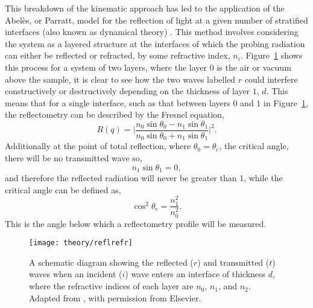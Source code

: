 This breakdown of the kinematic approach has led to the application of the Abel\`{e}s, or Parratt, model for the reflection of light at a given number of stratified interfaces (also known as dynamical theory) \cite{abeles_sur_1948,parratt_surface_1954}.
This method involves considering the system as a layered structure at the interfaces of which the probing radiation can either be reflected or refracted, by some refractive index, $n_i$.
Figure~\ref{fig:reflrefr} shows this process for a system of two layers, where the layer $0$ is the air or vacuum above the sample, it is clear to see how the two waves labelled $r$ could interfere constructively or destructively depending on the thickness of layer $1$, $d$.
This means that for a single interface, such as that between layers $0$ and $1$ in Figure~\ref{fig:reflrefr}, the reflectometry can be described by the Fresnel equation,
%
\begin{equation}
    R(q) = \bigg| \frac{n_0\sin{\theta_0} - n_1\sin{\theta_1}}{n_0\sin{\theta_0} + n_1\sin{\theta_1}} \bigg|^2.
\end{equation}
%
Additionally at the point of total reflection, where $\theta_0 = \theta_{\text{c}}$, the critical angle, there will be no transmitted wave so,
%
\begin{equation}
    n_1\sin{\theta_1} = 0,
\end{equation}
%
and therefore the reflected radiation will never be greater than 1, while the critical angle can be defined as,
%
\begin{equation}
    \cos^2{\theta_{\text{c}}} = \frac{n_1^2}{n_0^2}.
\end{equation}
%
This is the angle below which a reflectometry profile will be measured.
%
\begin{figure}
    \centering
    \texttt{[image: theory/reflrefr]}
    \caption{A schematic diagram showing the reflected ($r$) and transmitted ($t$) waves when an incident ($i$) wave enters an interface of thickness $d$, where the refractive indices of each layer are $n_0$, $n_1$, and $n_2$. Adapted from \cite{foglia_studies_2015}, with permission from Elsevier.}
    \label{fig:reflrefr}
\end{figure}
%

